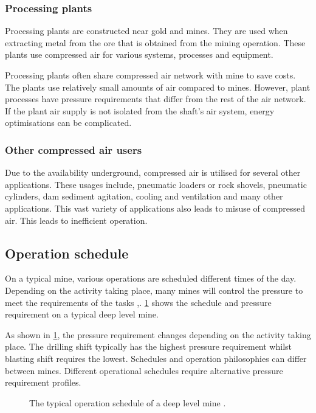 \subsubsection{Processing plants}
Processing plants are constructed near gold and mines. They are used when extracting metal from the ore that is obtained from the mining operation. These plants use compressed air for various systems, processes and equipment. 
\par 
Processing plants often share compressed air network with mine to save costs\cite{Marais2012PhD}. The plants use relatively small amounts of air compared to mines. However, plant processes have pressure requirements that differ from the rest of the air network. If the plant air supply is not isolated from the shaft's air system, energy optimisations can be complicated. 
\subsubsection{Other compressed air users}
Due to the availability underground, compressed air is utilised for several other applications. These usages include, pneumatic loaders or rock shovels, pneumatic cylinders, dam sediment agitation, cooling and ventilation and many other applications. This vast variety of applications also leads to misuse of compressed air. This leads to inefficient operation.
\subsection{Operation schedule}
On a typical mine, various operations are scheduled different times of the day. Depending on the activity taking place, many mines will control the pressure to meet the requirements of the tasks \cite{Kriel2014Masters},\cite{Marais2012PhD}. \cref{fig: Mining schedule} shows the schedule and pressure requirement on a typical deep level mine.\par 
As shown in \cref{fig: Mining schedule}, the pressure requirement changes depending on the activity taking place. The drilling shift typically has the highest pressure requirement whilst blasting shift requires the lowest. Schedules and operation philosophies can differ between mines. Different operational schedules require alternative pressure requirement profiles.
\begin{figure}[h]
	\centering
	\fbox{}
	\caption[A typical operation schedule of a deep level mine.]{The typical operation schedule of a deep level mine \cite{Kriel2014Masters}.}
	\label{fig: Mining schedule}
\end{figure}
